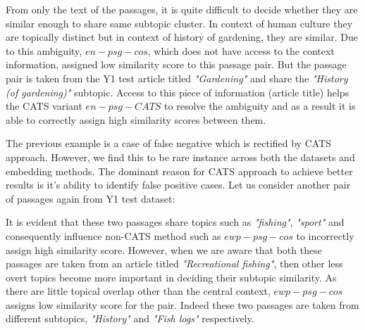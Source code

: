 \documentclass[sigconf,authordraft]{acmart}
\begin{document}
From only the text of the passages, it is quite difficult to decide whether they are similar enough to share same subtopic cluster. In context of human culture they are topically distinct but in context of history of gardening, they are similar. Due to this ambiguity, $en-psg-cos$, which does not have access to the context information, assigned low similarity score to this passage pair. But the passage pair is taken from the Y1 test article titled \textit{"Gardening"} and share the \textit{"History (of gardening)"} subtopic. Access to this piece of information (article title) helps the CATS variant $en-psg-CATS$ to resolve the ambiguity and as a result it is able to correctly assign high similarity scores between them.

The previous example is a case of false negative which is rectified by CATS approach. However, we find this to be rare instance across both the datasets and embedding methods. The dominant reason for CATS approach to achieve better results is it's ability to identify false positive cases. Let us consider another pair of passages again from Y1 test dataset:

\noindent{}

It is evident that these two passages share topics such as \textit{"fishing"}, \textit{"sport"} and consequently influence non-CATS method such as $ewp-psg-cos$ to incorrectly assign high similarity score. However, when we are aware that both these passages are taken from an article titled \textit{"Recreational fishing"}, then other less overt topics become more important in deciding their subtopic similarity. As there are little topical overlap other than the central context, $ewp-psg-cos$ assigns low similarity score for the pair. Indeed these two passages are taken from different subtopics, \textit{"History"} and \textit{"Fish logs"} respectively. 
\end{document}
